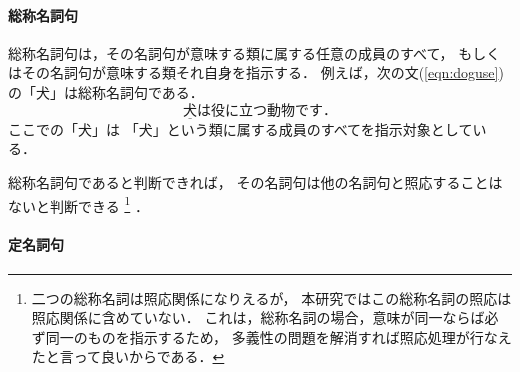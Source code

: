 \begin{figure}[t]
\begin{center}
\end{center}
\end{figure}

\paragraph{総称名詞句}

総称名詞句は，その名詞句が意味する類に属する任意の成員のすべて，
もしくはその名詞句が意味する類それ自身を指示する．
例えば，次の文(\ref{eqn:doguse})の「犬」は総称名詞句である．
\begin{equation}
\underline{犬}は役に立つ動物です．
  \label{eqn:doguse}
\end{equation}
ここでの「犬」は
「犬」という類に属する成員のすべてを指示対象としている．

総称名詞句であると判断できれば，
その名詞句は他の名詞句と照応することは
ないと判断できる
\footnote{
二つの総称名詞は照応関係になりえるが，
本研究ではこの総称名詞の照応は照応関係に含めていない．
これは，総称名詞の場合，意味が同一ならば必ず同一のものを指示するため，
多義性の問題を解消すれば照応処理が行なえたと言って良いからである．
}
．

\paragraph{定名詞句}

